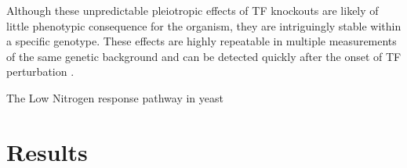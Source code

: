 Although these unpredictable pleiotropic effects of TF knockouts are likely of little phenotypic consequence for the organism, they are intriguingly stable within a specific genotype. These effects are highly repeatable in multiple measurements of the same genetic background and can be detected quickly after the onset of TF perturbation \cite{Mahendrawada2025}. 

The Low Nitrogen response pathway in yeast


\section{Results}
\label{sec:results}